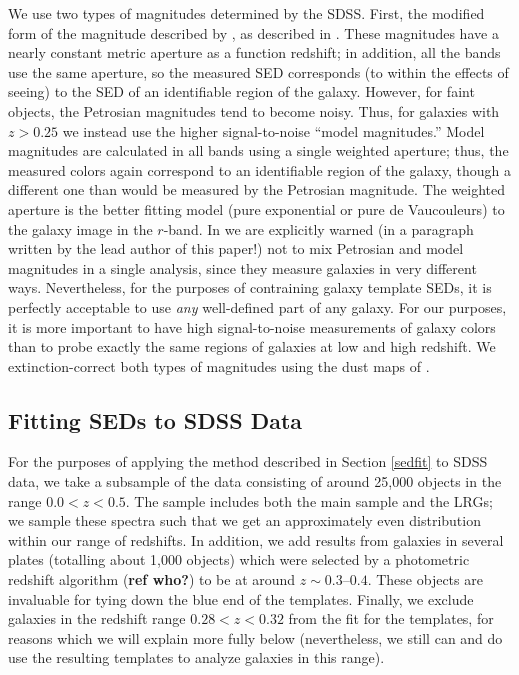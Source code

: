 \documentclass[10pt,preprint]{aastex}
\begin{document}
We use two types of magnitudes determined by the SDSS. First, the
modified form of the magnitude described by \citet{petrosian76a}, as
described in \citet{strauss02a}.  These magnitudes have a nearly
constant metric aperture as a function redshift; in addition, all the
bands use the same aperture, so the measured SED corresponds (to
within the effects of seeing) to the SED of an identifiable region of
the galaxy. However, for faint objects, the Petrosian magnitudes tend
to become noisy. Thus, for galaxies with $z>0.25$ we instead use the
higher signal-to-noise ``model magnitudes.'' Model magnitudes are
calculated in all bands using a single weighted aperture; thus, the
measured colors again correspond to an identifiable region of the
galaxy, though a different one than would be measured by the Petrosian
magnitude. The weighted aperture is the better fitting model (pure
exponential or pure de Vaucouleurs) to the galaxy image in the
$r$-band. In \citet{stoughton01a} we are explicitly warned (in a
paragraph written by the lead author of this paper!)  not to mix
Petrosian and model magnitudes in a single analysis, since they
measure galaxies in very different ways. Nevertheless, for the
purposes of contraining galaxy template SEDs, it is perfectly
acceptable to use {\it any} well-defined part of any galaxy.  For our
purposes, it is more important to have high signal-to-noise
measurements of galaxy colors than to probe exactly the same regions
of galaxies at low and high redshift.  We extinction-correct both
types of magnitudes using the dust maps of \citet{schlegel98a}. 

\subsection{Fitting SEDs to SDSS Data}

For the purposes of applying the method described in Section
\ref{sedfit} to SDSS data, we take a subsample of the data consisting
of around 25,000 objects in the range $0.0<z<0.5$. The sample includes
both the main sample and the LRGs; we sample these spectra such that
we get an approximately even distribution within our range of
redshifts. In addition, we add results from galaxies in several plates
(totalling about 1,000 objects) which were selected by a photometric
redshift algorithm ({\bf ref who?}) to be at around $z\sim
0.3$--$0.4$. These objects are invaluable for tying down the blue end
of the templates. Finally, we exclude galaxies in the redshift range
$0.28 <z<0.32$ from the fit for the templates, for reasons which we
will explain more fully below (nevertheless, we still can and do use
the resulting templates to analyze galaxies in this range).
\end{document}
